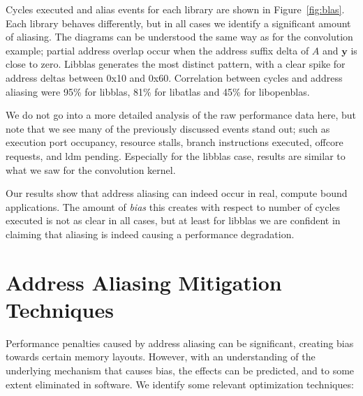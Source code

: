\documentclass[10pt, conference, compsocconf]{IEEEtran}
\begin{document}
Cycles executed and alias events for each library are shown in Figure~\ref{fig:blas}.
Each library behaves differently, but in all cases we identify a significant amount of aliasing. 
The diagrams can be understood the same way as for the convolution example; partial address overlap occur when the address suffix delta of $A$ and $\boldsymbol{y}$ is close to zero.
Libblas generates the most distinct pattern, with a clear spike for address deltas between 0x10 and 0x60.
Correlation between cycles and address aliasing were 95\% for libblas, 81\% for libatlas and 45\% for libopenblas.

We do not go into a more detailed analysis of the raw performance data here, but note that we see many of the previously discussed events stand out; such as execution port occupancy, resource stalls, branch instructions executed, offcore requests, and ldm pending.
Especially for the libblas case, results are similar to what we saw for the convolution kernel.

Our results show that address aliasing can indeed occur in real, compute bound applications.
The amount of \emph{bias} this creates with respect to number of cycles executed is not as clear in all cases, but at least for libblas we are confident in claiming that aliasing is indeed causing a performance degradation.


\section{Address Aliasing Mitigation Techniques}
\label{sec:mitigation}
Performance penalties caused by address aliasing can be significant, creating bias towards certain memory layouts.
However, with an understanding of the underlying mechanism that causes bias, the effects can be predicted, and to some extent eliminated in software.
We identify some relevant optimization techniques:
\end{document}
